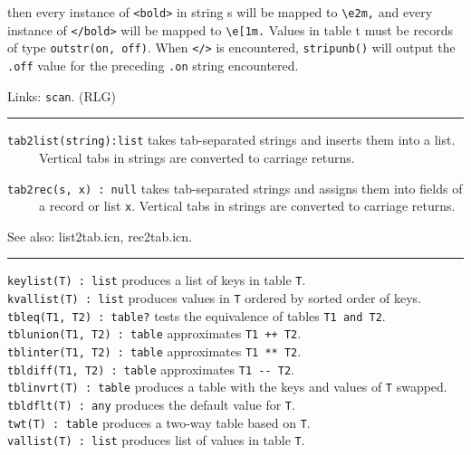 \iconcode{
key: {\textquotedbl}underline{\textquotedbl} value:
outstr({\textquotedbl}{\textbackslash}e[4m{\textquotedbl},
{\textquotedbl}{\textbackslash}e1m{\textquotedbl}) etc.}

then every instance of
\texttt{{\textquotedbl}{\textless}bold{\textgreater}{\textquotedbl}} in
string s will be mapped to
\texttt{{\textquotedbl}{\textbackslash}e2m,{\textquotedbl}} and every
instance of
\texttt{{\textquotedbl}{\textless}/bold{\textgreater}{\textquotedbl}}
will be mapped to
\texttt{{\textquotedbl}{\textbackslash}e[1m.{\textquotedbl}} Values in
table t must be records of type \texttt{outstr(on, off)}. When
\texttt{{\textquotedbl}{\textless}/{\textgreater}{\textquotedbl}} is
encountered, \texttt{stripunb()} will output the \texttt{.off} value
for the preceding \texttt{.on} string encountered.

Links: \texttt{scan}. (RLG)

\vspace{0.25cm}\hrule{}

\texttt{tab2list(string):list} takes tab-separated strings and inserts
them into a list.\\
 \ \ \ \ \ Vertical tabs in strings are converted to carriage returns.

\texttt{tab2rec(s, x) : null} takes tab-separated strings and assigns
them into fields of\\
 \ \ \ \ \ a record or list \texttt{x}. Vertical tabs in strings are
converted to carriage returns.

See also: list2tab.icn, rec2tab.icn. 

\vspace{0.25cm}\hrule{}

\texttt{keylist(T) : list} produces a list of keys in table
\texttt{T}.\\
\texttt{kvallist(T) : list} produces values in \texttt{T} ordered by
sorted order of keys.\\
\texttt{tbleq(T1, T2) : table?} tests the equivalence of tables
\texttt{T1 and T2}.\\
\texttt{tblunion(T1, T2) : table} approximates \texttt{T1 ++
T2}.\\
\texttt{tblinter(T1, T2) : table} approximates \texttt{T1 **
T2}.\\
\texttt{tbldiff(T1, T2) : table} approximates \texttt{T1 -{}-
T2}.\\
\texttt{tblinvrt(T) : table} produces a table with the keys and values
of \texttt{T} swapped.\\
\texttt{tbldflt(T) : any} produces the default value for
\texttt{T}.\\
\texttt{twt(T) : table} produces a two-way table
based on \texttt{T}.\\
\texttt{vallist(T) : list} produces list of values in table \texttt{T}.

